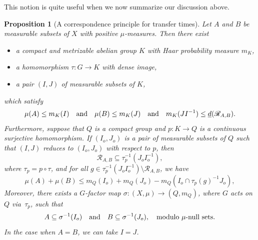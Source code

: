 \documentclass[10pt]{amsart}
\let\mathcal\mathscr
\newcommand{\cR}{\mathcal{R}}
\newcommand{\qand}{\quad\textup{and}\quad}
\theoremstyle{plain}
\newtheorem{proposition}[theorem]{Proposition}
\theoremstyle{definition}
\begin{document}
This notion is quite useful when we now summarize our discussion above.

\begin{proposition}[A correspondence principle for transfer times]
\label{mainprop}
Let $A$ and $B$ be measurable subsets of $X$ with positive $\mu$-measures. Then there exist

\begin{itemize}
\item a compact and metrizable abelian group $K$ with Haar probability measure $m_K$,
\item a homomorphism $\tau : G \to K$ with dense image,
\item a pair $(I,J)$ of measurable subsets of $K$,
\end{itemize}

which satisfy
\[
\mu(A) \leq m_K(I) \qand \mu(B) \leq m_K(J) \qand m_K(JI^{-1}) \leq \underline{d}(\cR_{A,B}).
\]
Furthermore, suppose that $Q$ is a compact group and $p : K \to Q$ is a continuous surjective homomorphism.
If $(I_o,J_o)$ is a pair of measurable subsets of $Q$ such that $(I,J)$ reduces to $(I_o,J_o)$ with respect to $p$,
then
\[
\cR_{A,B} \subseteq \tau_p^{-1}(J_o I_o^{-1}),
\]
where $\tau_p = p \circ \tau$, and for all $g \in \tau_p^{-1}(J_oI_o^{-1}) \setminus \cR_{A,B}$, we have
\[
\mu(A) + \mu(B) \leq m_Q(I_o) + m_Q(J_o) - m_Q(I_o \cap \tau_p(g)^{-1}J_o),
\]
Moreover, there exists a $G$-factor map $\sigma : (X,\mu) \to (Q,m_Q)$, where $G$ acts on $Q$ via~$\tau_p$, such that
\[
A \subseteq \sigma^{-1}(I_o) \qand B \subseteq \sigma^{-1}(J_o), \quad \textrm{modulo $\mu$-null sets}.
\]
In the case when $A = B$, we can take $I = J$.
\end{proposition}
\end{document}
